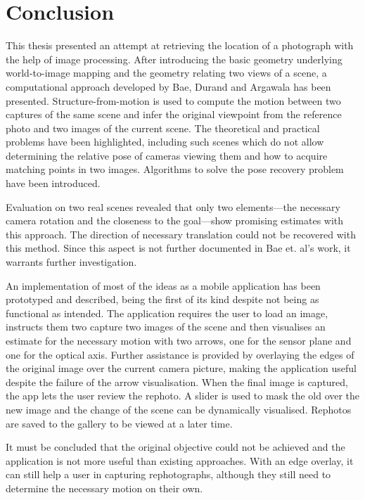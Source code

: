 \chapter{Conclusion}

This thesis presented an attempt at retrieving the location of a photograph with
the help of image processing. After introducing the basic geometry underlying
world-to-image mapping and the geometry relating two views of a scene, a
computational approach developed by Bae, Durand and Argawala has been presented.
Structure-from-motion is used to compute the motion between two captures of the
same scene and infer the original viewpoint from the reference photo and two
images of the current scene.  The theoretical and practical problems have been
highlighted, including such scenes which do not allow determining the relative
pose of cameras viewing them and how to acquire matching points in two images.
Algorithms to solve the pose recovery problem have been introduced.

Evaluation on two real scenes revealed that only two elements---the necessary
camera rotation and the closeness to the goal---show promising estimates with
this approach. The direction of necessary translation could not be recovered
with this method.  Since this
aspect is not further documented in Bae et. al's work, it warrants further
investigation.

An implementation of most of the ideas as a mobile application has been
prototyped and described, being the first of its kind despite not being as
functional as intended. The application requires the user to load an image,
instructs them two capture two images of the scene and then visualises an
estimate for the necessary motion with two arrows, one for the sensor plane and
one for the optical axis. Further assistance is provided by overlaying the edges
of the original image over the current camera picture, making the application
useful despite the failure of the arrow visualisation.  When the final image is
captured, the app lets the user review the rephoto. A slider is used to mask the
old over the new image and the change of the scene can be dynamically
visualised. Rephotos are saved to the gallery to be viewed at a later time.

It must be concluded that the original objective could not be achieved and
the application is not more useful than existing approaches. With an edge
overlay, it can still help a user in capturing rephotographs, although they
still need to determine the necessary motion on their own.
